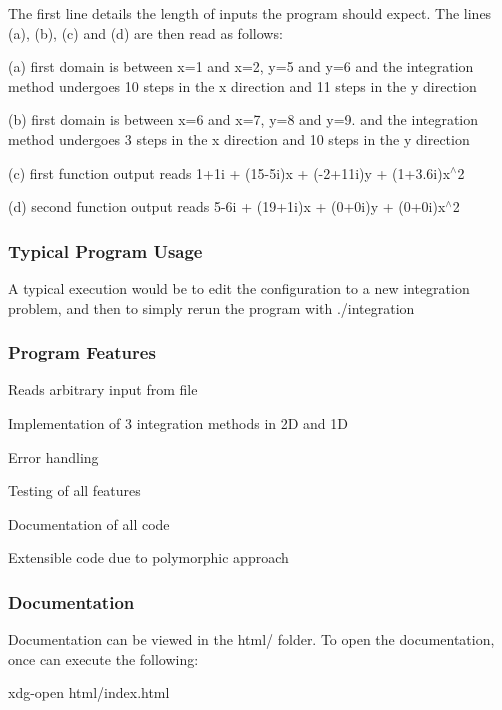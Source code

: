 The first line details the length of inputs the program should expect. The lines (a), (b), (c) and (d) are then read as follows\+:
\begin{DoxyItemize}
\item (a) first domain is between x=1 and x=2, y=5 and y=6 and the integration method undergoes 10 steps in the x direction and 11 steps in the y direction
\item (b) first domain is between x=6 and x=7, y=8 and y=9. and the integration method undergoes 3 steps in the x direction and 10 steps in the y direction
\item (c) first function output reads 1+1i + (15-\/5i)x + (-\/2+11i)y + (1+3.6i)x$^\wedge$2
\item (d) second function output reads 5-\/6i + (19+1i)x + (0+0i)y + (0+0i)x$^\wedge$2
\end{DoxyItemize}

\subsubsection*{Typical Program Usage}

A typical execution would be to edit the configuration to a new integration problem, and then to simply rerun the program with {\ttfamily ./integration}

\subsubsection*{Program Features}


\begin{DoxyItemize}
\item Reads arbitrary input from file
\item Implementation of 3 integration methods in 2D and 1D
\item Error handling
\item Testing of all features
\item Documentation of all code
\item Extensible code due to polymorphic approach
\end{DoxyItemize}

\subsubsection*{Documentation}

Documentation can be viewed in the {\ttfamily html/} folder. To open the documentation, once can execute the following\+: 
\begin{DoxyCode}
xdg-open html/index.html
\end{DoxyCode}


